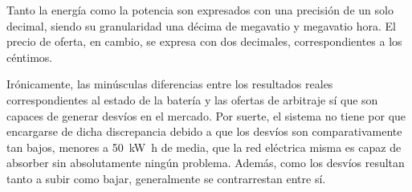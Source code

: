 Tanto la energía como la potencia son expresados con una precisión de un solo decimal, siendo su granularidad una décima de megavatio y megavatio hora. El precio de oferta, en cambio, se expresa con dos decimales, correspondientes a los céntimos.

Irónicamente, las minúsculas diferencias entre los resultados reales correspondientes al estado de la batería y las ofertas de arbitraje sí que son capaces de generar desvíos en el mercado. Por suerte, el sistema no tiene por que encargarse de dicha discrepancia debido a que los desvíos son comparativamente tan bajos, menores a \SI{50}{{\kilo\watt\hour}} de media, que la red eléctrica misma es capaz de absorber sin absolutamente ningún problema. Además, como los desvíos resultan tanto a subir como bajar, generalmente se contrarrestan entre sí.
